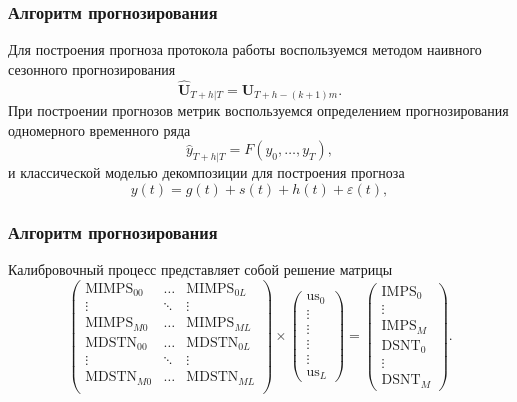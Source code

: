 \documentclass[handout]{beamer}
\begin{document}
\begin{frame}
    \frametitle{Алгоритм прогнозирования}
    Для построения прогноза протокола работы воспользуемся методом наивного сезонного прогнозирования
    \begin{equation*}
        \hat{\mathbf{U}}_{\left.T+h\right|T} = \mathbf{U}_{T+h-(k+1)m}.
    \end{equation*}
    При построении прогнозов метрик воспользуемся определением прогнозирования одномерного временного ряда
    \begin{equation*}
        \hat{y}_{\left.T+h\right|T} = F\left(y_0, \dots, y_T\right),
    \end{equation*}
    и классической моделью декомпозиции для построения прогноза
    \begin{equation*}
        y(t) = g(t) + s(t) + h(t) + \varepsilon(t),
    \end{equation*}
\end{frame}

\begin{frame}
    \frametitle{Алгоритм прогнозирования}
    Калибровочный процесс представляет собой решение матрицы
    \begin{equation*}
        \left(
            \begin{array}{ccc}
                \text{MIMPS}_{00} & \dots & \text{MIMPS}_{0L} \\
                \vdots & \ddots & \vdots \\
                \text{MIMPS}_{M0} & \dots & \text{MIMPS}_{ML} \\
                \text{MDSTN}_{00} & \dots & \text{MDSTN}_{0L} \\
                \vdots & \ddots & \vdots \\
                \text{MDSTN}_{M0} & \dots & \text{MDSTN}_{ML} \\
            \end{array}
        \right)\times
        \left(
            \begin{array}{c}
                \text{us}_{0} \\
                \vdots \\
                \vdots \\
                \vdots \\
                \vdots \\
                \text{us}_{L}
            \end{array}
        \right) = 
        \left(
            \begin{array}{c}
                \text{IMPS}_0 \\
                \vdots \\
                \text{IMPS}_M \\
                \text{DSNT}_0 \\
                \vdots \\
                \text{DSNT}_M
            \end{array}
        \right).
    \end{equation*}
\end{frame}
\end{document}
